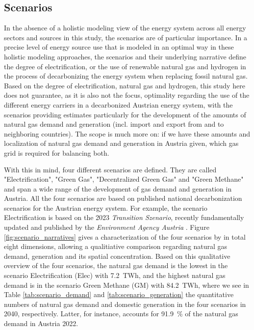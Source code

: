 \subsection{Scenarios}\label{scenarios}
In the absence of a holistic modeling view of the energy system across all energy sectors and sources in this study, the scenarios are of particular importance. In a precise level of energy source use that is modeled in an optimal way in these holistic modeling approaches, the scenarios and their underlying narrative define the degree of electrification, or the use of renewable natural gas and hydrogen in the process of decarbonizing the energy system when replacing fossil natural gas. Based on the degree of electrification, natural gas and hydrogen, this study here does not guarantee, as it is also not the focus, optimality regarding the use of the different energy carriers in a decarbonized Austrian energy system, with the scenarios providing estimates particularly for the development of the amounts of natural gas demand and generation (incl. import and export from and to neighboring countries). The scope is much more on: if we have these amounts and localization of natural gas demand and generation in Austria given, which gas grid is required for balancing both.\vspace{0.3cm}

With this in mind, four different scenarios are defined. They are called "Electrification", "Green Gas", "Decentralized Green Gas" and "Green Methane" and span a wide range of the development of gas demand and generation in Austria. All the four scenarios are based on published national decarbonization scenarios for the Austrian energy system. For example, the scenario Electrification is based on the 2023 \textit{Transition Szenario}, recently fundamentally updated and published by the \textit{Environment Agency Austria} \cite{umweltbundesamt}. Figure \ref{fig:scenario_narratives} gives a characterization of the four scenarios by in total eight dimensions, allowing a qualitiative comparison regarding natural gas demand, generation and its spatial concentration. Based on this qualitative overview of the four scenarios, the natural gas demand is the lowest in the scenario Electrification (Elec) with \SI{7.2}{TWh}, and the highest natural gas demand is in the scenario Green Methane (GM) with \SI{84.2}{TWh}, where we see in Table \ref{tab:scenario_demand} and \ref{tab:scenario_generation} the quantitative numbers of natural gas demand and domestic generation in the four scenarios in 2040, respectively. Latter, for instance, accounts for \SI{91.9}{\%} of the natural gas demand in Austria 2022. 


